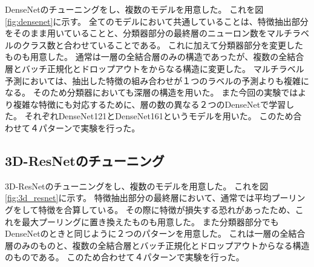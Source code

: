 DenseNetのチューニングをし、複数のモデルを用意した。
これを図\ref{fig:densenet}に示す。
全てのモデルにおいて共通していることは、特徴抽出部分をそのまま用いていることと、分類器部分の最終層のニューロン数をマルチラベルのクラス数と合わせていることである。
これに加えて分類器部分を変更したものも用意した。
通常は一層の全結合層のみの構造であったが、複数の全結合層とバッチ正規化とドロップアウトをからなる構造に変更した。
マルチラベル予測においては、抽出した特徴の組み合わせが１つのラベルの予測よりも複雑になる。
そのため分類器においても深層の構造を用いた。
また今回の実験ではより複雑な特徴にも対応するために、層の数の異なる２つのDenseNetで学習した。
それぞれDenseNet121\cite{DenseNet}とDenseNet161\cite{DenseNet}というモデルを用いた。
このため合わせて４パターンで実験を行った。
\subsection{3D-ResNetのチューニング}

3D-ResNetのチューニングをし、複数のモデルを用意した。
これを図\ref{fig:3d_resnet}に示す。
特徴抽出部分の最終層において、通常では平均プーリングをして特徴を合算している。
その際に特徴が損失する恐れがあったため、これを最大プーリングに置き換えたものも用意した。
また分類器部分でもDenseNetのときと同じように２つのパターンを用意した。
これは一層の全結合層のみのものと、複数の全結合層とバッチ正規化とドロップアウトからなる構造のものである。
このため合わせて４パターンで実験を行った。
